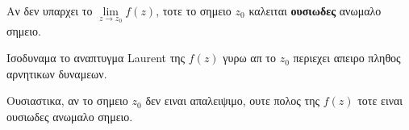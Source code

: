 \begin{dfn}
  Αν δεν υπαρχει το $\lim\limits_{z\to z_0}f(z)$, τοτε το σημειο $z_0$ καλειται 
  \textbf{ουσιωδες} ανωμαλο σημειο. 

  \begin{myitemize}
    \item Ισοδυναμα το αναπτυγμα Laurent της $f(z)$ \textcolor{Col2}{γυρω απ το $z_0$} 
      περιεχει απειρο πληθος αρνητικων δυναμεων.
  \end{myitemize}
\end{dfn}

\begin{rem}
  Ουσιαστικα, αν το σημειο $z_0$ δεν ειναι απαλειψιμο, ουτε πολος της 
  $f(z)$ τοτε ειναι ουσιωδες ανωμαλο σημειο.
\end{rem}




